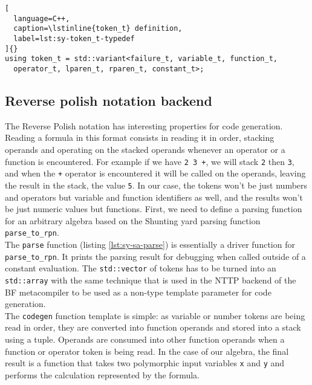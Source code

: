 \documentclass[../paper.tex]{subfiles}
\begin{document}
\begin{lstlisting}[
  language=C++,
  caption=\lstinline{token_t} definition,
  label=lst:sy-token_t-typedef
]{}
using token_t = std::variant<failure_t, variable_t, function_t,
  operator_t, lparen_t, rparen_t, constant_t>;
\end{lstlisting}



\subsection{Reverse polish notation backend}

The Reverse Polish notation has interesting properties for code generation.
Reading a formula in this format consists in reading it in order, stacking
operands and operating on the stacked operands whenever an operator or a
function is encountered. For example if we have \lstinline{2 3 +}, we will stack
\lstinline{2} then \lstinline{3}, and when the \lstinline{+} operator is
encountered it will be called on the operands, leaving the result in the stack,
\ie the value \lstinline{5}.
In our case, the tokens won't be just numbers and operators but variable and
function identifiers as well, and the results won't be just numeric values but
functions. First, we need to define a \constexpr parsing function for an
arbitrary algebra based on the \constexpr Shunting yard parsing function
\ie \lstinline{parse_to_rpn}.\\

The \lstinline{parse} function (listing \ref{lst:sy-sa-parse}) is
essentially a driver function for \lstinline{parse_to_rpn}. It prints the
parsing result for debugging when called outside of a constant evaluation.
The \lstinline{std::vector} of tokens has to be turned into an
\lstinline{std::array} with the same technique that is used in the NTTP backend
of the BF metacompiler to be used as a non-type template parameter for code
generation.\\

The \lstinline{codegen} function template is simple: as variable or number tokens
are being read in order, they are converted into function operands and stored
into a stack using a tuple. Operands are consumed into other function operands
when a function or operator token is being read. In the case of our algebra,
the final result is a function that takes two polymorphic input variables
\lstinline{x} and \lstinline{y} and performs the calculation represented by the
formula.
\end{document}
